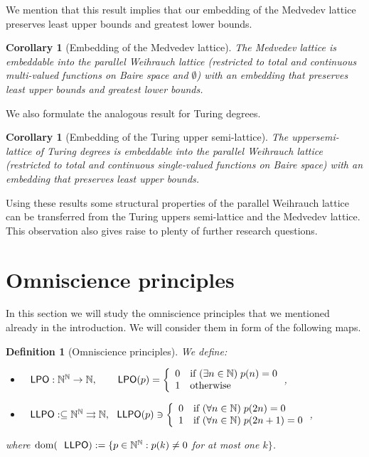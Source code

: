 \documentclass[jsl,10pt]{noasl}
\def\IN{{\mathbb{N}}}
\def\In{\subseteq}
\def\mto{\rightrightarrows}
\def\dom{{\rm dom}}
\def\LPO{\text{\rm\sffamily LPO}}
\def\LLPO{\text{\rm\sffamily LLPO}}
\def\LPO{\text{\rm\sffamily LPO}}
\def\LLPO{\text{\rm\sffamily LLPO}}
\def\emptyW{\boldsymbol{\emptyset}}
\newtheorem{definition}[proposition]{Definition}
\newtheorem{corollary}[proposition]{Corollary}
\begin{document}
We mention that this result implies that our embedding of the Medvedev lattice
preserves least upper bounds and greatest lower bounds.

\begin{corollary}[Embedding of the Medvedev lattice]
The Medvedev lattice is embeddable into the parallel Weihrauch lattice (restricted
to total and continuous multi-valued functions on Baire space and $\emptyW$) with an embedding
that preserves least upper bounds and greatest lower bounds.
\end{corollary}

We also formulate the analogous result for Turing degrees.

\begin{corollary}[Embedding of the Turing upper semi-lattice]
The upper\linebreak semi-lattice of Turing degrees is embeddable into the parallel
Weihrauch lattice (restricted to total and continuous single-valued functions on Baire space)
with an embedding that preserves least upper bounds.
\end{corollary}

Using these results some structural properties of the parallel Weihrauch lattice
can be transferred from the Turing uppers semi-lattice and the Medvedev lattice.
This observation also gives raise to plenty of further research questions.


\section{Omniscience principles}
\label{sec:omniscience}

In this section we will study the omniscience principles
that we mentioned already in the introduction. We will consider
them in form of the following maps.

\begin{definition}[Omniscience principles]\rm
We define:
\begin{itemize}
\item $\LPO:\IN^\IN\to\IN,\hspace{4.9mm}\LPO(p)=\left\{\begin{array}{ll}
       0 & \mbox{if $(\exists n\in\IN)\;p(n)=0$}\\
       1 & \mbox{otherwise}
       \end{array}\right.$,
\item $\LLPO:\In\IN^\IN\mto\IN,\LLPO(p)\ni\left\{\begin{array}{ll}
       0 & \mbox{if $(\forall n\in\IN)\;p(2n)=0$}\\
       1 & \mbox{if $(\forall n\in\IN)\;p(2n+1)=0$}
       \end{array}\right.$,
\end{itemize}
where $\dom(\LLPO):=\{p\in\IN^\IN:p(k)\not=0$ for at most one $k\}$.
\end{definition}
\end{document}
